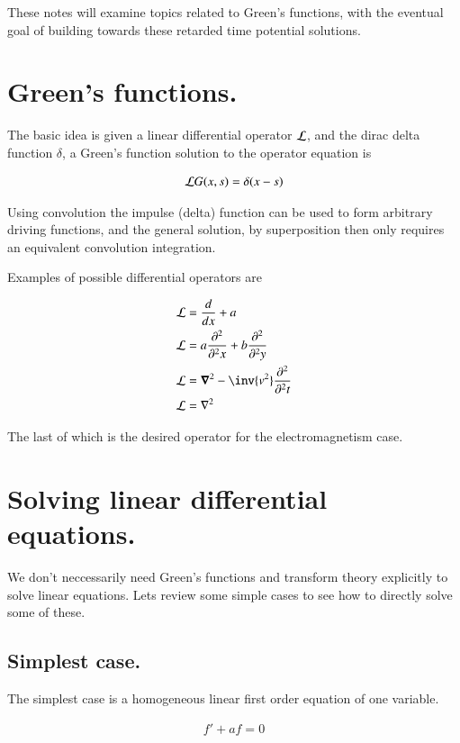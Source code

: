 \documentclass{article}
\begin{document}
These notes will examine topics related to
Green's functions, with the eventual goal of building towards these
retarded time potential solutions.

\section{ Green's functions. }

The basic idea is given a
linear differential operator $\mathcal{L}$, and the dirac delta function $\delta$, a Green's function solution to the operator equation is

\begin{align*}
\mathcal{L} G(x,s) = \delta(x-s)
\end{align*}

Using convolution the impulse (delta) function can be used to form
arbitrary driving functions, and the general solution, by superposition
then only requires an equivalent convolution integration.

Examples of possible differential operators are

\begin{align*}
\LL &= \frac{d}{dx} + a \\
\LL &= a \PDsq{x}{} + b \PDsq{y}{} \\
\LL &= \spacegrad^2 - \inv{v^2}\PDsq{t}{}\\
\LL &= \grad^2 \\
\end{align*}

The last of which is the desired operator for the electromagnetism case.

\section{ Solving linear differential equations. }

We don't neccessarily need Green's functions and transform theory explicitly
to solve linear equations.  Lets review some simple cases to see how to 
directly solve some of these.

\subsection{ Simplest case. }

The simplest case is a homogeneous linear first order equation of one variable.

\begin{align*}
f' + a f = 0
\end{align*}
\end{document}

